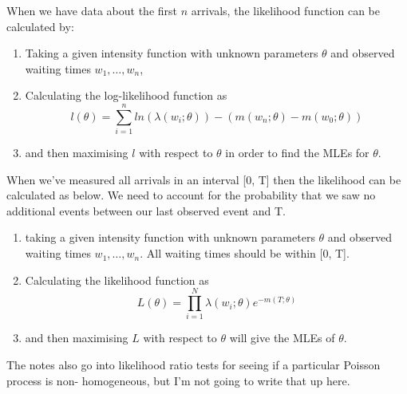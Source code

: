 When we have data about the first \(n\) arrivals, the likelihood function can
be calculated by: 
\begin{enumerate}
    \item Taking a given intensity function with unknown parameters \(\theta\) and observed waiting times \(w_1, \dots, w_n\),
    \item Calculating the log-likelihood function as 
        \begin{equation*}
            l(\theta) = \sum_{i=1}^{n}ln\left(\lambda(w_i; \theta)\right) - 
            \left(m(w_n; \theta) - m(w_0; \theta)\right)
        \end{equation*}
    \item and then maximising \(l\) with respect to \(\theta\) in order to find
        the MLEs for \(\theta\).
\end{enumerate}

When we've measured all arrivals in an interval [0, T] then the likelihood can
be calculated as below. We need to account for the probability that we saw no
additional events between our last observed event and T.
\begin{enumerate}
    \item taking a given intensity function with unknown parameters \(\theta\)
        and observed waiting times \(w_1, \dots, w_n\). All waiting times
        should be within [0, T].
    \item Calculating the likelihood function as 
        \begin{equation*}
            L(\theta) = \prod_{i=1}^{N}\lambda(w_i; \theta) e^{-m(T; \theta)}
        \end{equation*}
    \item and then maximising \(L\) with respect to \(\theta\) will give the
        MLEs of \(\theta\).
\end{enumerate}

The notes also go into likelihood ratio tests for seeing if a particular
Poisson process is non- homogeneous, but I'm not going to write that up
here.
